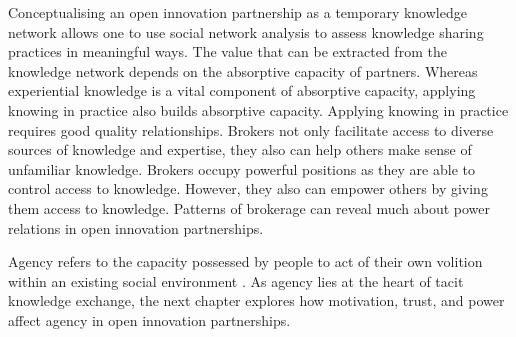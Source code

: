 Conceptualising an open innovation partnership as a temporary knowledge network allows one to use social network analysis to assess knowledge sharing practices in meaningful ways. The value that can be extracted from the knowledge network depends on the absorptive capacity of partners. Whereas experiential knowledge is a vital component of absorptive capacity, applying knowing in practice also builds absorptive capacity. Applying knowing in practice requires good quality relationships. Brokers not only facilitate access to diverse sources of knowledge and expertise, they also can help others make sense of unfamiliar knowledge. Brokers occupy powerful positions as they are able to control access to knowledge. However, they also can empower others by giving them access to knowledge. Patterns of brokerage can reveal much about power relations in open innovation partnerships. \medskip

Agency refers to the capacity possessed by people to act of their own volition within an existing social environment   \citep{bandura1989human,emirbayer1998agency}. As agency lies at the heart of tacit knowledge exchange, the next chapter explores how motivation, trust, and power affect agency in open innovation partnerships.